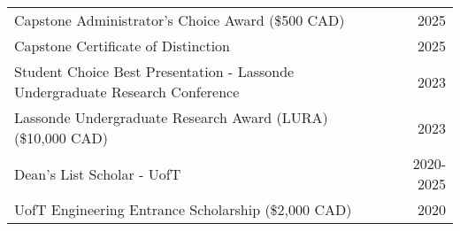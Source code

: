 \begin{tabularx}{\textwidth}{@{}X r@{}}
    Capstone Administrator's Choice Award (\$500 CAD) & 2025 \\
    Capstone Certificate of Distinction & 2025 \\
    Student Choice Best Presentation - Lassonde Undergraduate Research Conference & 2023 \\
    Lassonde Undergraduate Research Award (LURA) (\$10,000 CAD) & 2023 \\
    Dean's List Scholar - UofT & 2020-2025 \\
    UofT Engineering Entrance Scholarship (\$2,000 CAD) & 2020 \\
\end{tabularx}
